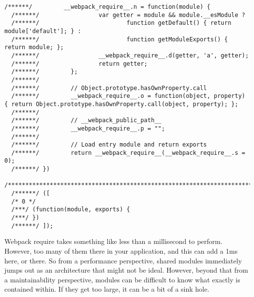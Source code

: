 \begin{lstlisting}[caption=webpack require source code]
  /******/         __webpack_require__.n = function(module) {
  /******/                 var getter = module && module.__esModule ?
  /******/                         function getDefault() { return module['default']; } :
  /******/                         function getModuleExports() { return module; };
  /******/                 __webpack_require__.d(getter, 'a', getter);
  /******/                 return getter;
  /******/         };
  /******/
  /******/         // Object.prototype.hasOwnProperty.call
  /******/         __webpack_require__.o = function(object, property) { return Object.prototype.hasOwnProperty.call(object, property); };
  /******/
  /******/         // __webpack_public_path__
  /******/         __webpack_require__.p = "";
  /******/
  /******/         // Load entry module and return exports
  /******/         return __webpack_require__(__webpack_require__.s = 0);
  /******/ })
  /************************************************************************/
  /******/ ([
  /* 0 */
  /***/ (function(module, exports) {
  /***/ })
  /******/ ]);  
\end{lstlisting}

Webpack require takes something like less than a millisecond to perform. However, too many of them there 
in your application, and this can add a 1ms here, or there. So from a performance perspective, shared 
modules immediately jumps out as an architecture that might not be ideal. However, beyond that 
from a maintainability perspective, modules can be difficult to know what exactly is contained 
within. If they get too large, it can be a bit of a sink hole. 

